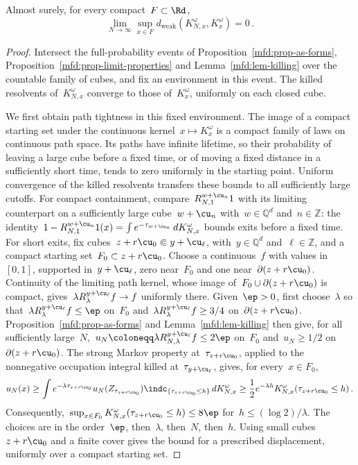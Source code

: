 \documentclass[11pt]{amsart}
\begin{document}
\smallskip

\begin{proposition}
\label{mfd:prop-as-quenched}
Almost surely, for every compact~$F\subset\Rd$,
\begin{equation*}
	\lim_{N\to\infty}\sup_{x\in F}
	d_{\mathrm{weak}}(K^\omega_{N,x},K^\omega_x)=0\,.
\end{equation*}
\end{proposition}
\begin{proof}
Intersect the full-probability events of Proposition~\ref{mfd:prop-as-forms}, Proposition~\ref{mfd:prop-limit-properties} and Lemma~\ref{mfd:lem-killing} over the countable family of cubes, and fix an environment in this event. The killed resolvents of~$K^\omega_{N,x}$ converge to those of~$K^\omega_x$, uniformly on each closed cube.

\smallskip

We first obtain path tightness in this fixed environment. The image of a compact starting set under the continuous kernel~$x\mapsto K^\omega_x$ is a compact family of laws on continuous path space. Its paths have infinite lifetime, so their probability of leaving a large cube before a fixed time, or of moving a fixed distance in a sufficiently short time, tends to zero uniformly in the starting point. Uniform convergence of the killed resolvents transfers these bounds to all sufficiently large cutoffs. For compact containment, compare~$R^{w+\cu_n}_{N,1}1$ with its limiting counterpart on a sufficiently large cube~$w+\cu_n$ with~$w\in\mathbb Q^d$ and~$n\in\mathbb Z$: the identity~$1-R^{w+\cu_n}_{N,1}1(x)=\int e^{-\tau_{w+\cu_n}}\,dK^\omega_{N,x}$ bounds exits before a fixed time. For short exits, fix cubes~$z+r\cu_0\Subset y+\cu_\ell$, with~$y\in\mathbb Q^d$ and~$\ell\in\mathbb Z$, and a compact starting set~$F_0\subset z+r\cu_0$. Choose a continuous~$f$ with values in~$[0,1]$, supported in~$y+\cu_\ell$, zero near~$F_0$ and one near~$\partial(z+r\cu_0)$. Continuity of the limiting path kernel, whose image of~$F_0\cup\partial(z+r\cu_0)$ is compact, gives~$\lambda R^{y+\cu_\ell}_\lambda f\to f$ uniformly there. Given~$\ep>0$, first choose~$\lambda$ so that~$\lambda R^{y+\cu_\ell}_\lambda f\leq\ep$ on~$F_0$ and~$\lambda R^{y+\cu_\ell}_\lambda f\geq3/4$ on~$\partial(z+r\cu_0)$. Proposition~\ref{mfd:prop-as-forms} and Lemma~\ref{mfd:lem-killing} then give, for all sufficiently large~$N$,~$u_N\coloneqq\lambda R^{y+\cu_\ell}_{N,\lambda}f\leq2\ep$ on~$F_0$ and~$u_N\geq1/2$ on~$\partial(z+r\cu_0)$. The strong Markov property at~$\tau_{z+r\cu_0}$, applied to the nonnegative occupation integral killed at~$\tau_{y+\cu_\ell}$, gives, for every~$x\in F_0$,
\begin{equation*}
	u_N(x)\geq\int
	e^{-\lambda\tau_{z+r\cu_0}}u_N(Z_{\tau_{z+r\cu_0}})\indc_{\{\tau_{z+r\cu_0}\leq h\}}\,dK^\omega_{N,x}
	\geq\frac12e^{-\lambda h}K^\omega_{N,x}(\tau_{z+r\cu_0}\leq h)
	\,.
\end{equation*}
Consequently,~$\sup_{x\in F_0}K^\omega_{N,x}(\tau_{z+r\cu_0}\leq h)\leq8\ep$ for~$h\leq(\log2)/\lambda$. The choices are in the order~$\ep$, then~$\lambda$, then~$N$, then~$h$. Using small cubes~$z+r\cu_0$ and a finite cover gives the bound for a prescribed displacement, uniformly over a compact starting set.


\end{proof}
\end{document}
